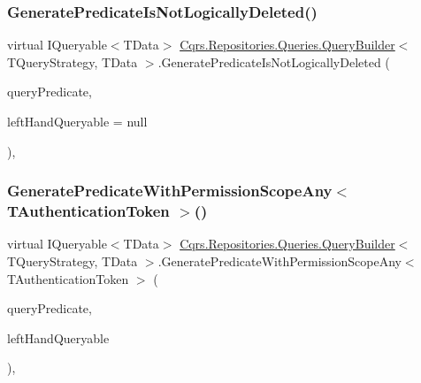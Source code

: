 \subsubsection{\texorpdfstring{Generate\+Predicate\+Is\+Not\+Logically\+Deleted()}{GeneratePredicateIsNotLogicallyDeleted()}}
{\footnotesize\ttfamily virtual I\+Queryable$<$T\+Data$>$ \hyperlink{classCqrs_1_1Repositories_1_1Queries_1_1QueryBuilder}{Cqrs.\+Repositories.\+Queries.\+Query\+Builder}$<$ T\+Query\+Strategy, T\+Data $>$.Generate\+Predicate\+Is\+Not\+Logically\+Deleted (\begin{DoxyParamCaption}\item[{\hyperlink{classCqrs_1_1Repositories_1_1Queries_1_1QueryPredicate}{Query\+Predicate}}]{query\+Predicate,  }\item[{I\+Queryable$<$ T\+Data $>$}]{left\+Hand\+Queryable = {\ttfamily null} }\end{DoxyParamCaption})\hspace{0.3cm}{\ttfamily [protected]}, {\ttfamily [virtual]}}

\mbox{\label{classCqrs_1_1Repositories_1_1Queries_1_1QueryBuilder_a7768a63fd46f991f87a00b51484c2f34_a7768a63fd46f991f87a00b51484c2f34}} 
\subsubsection{\texorpdfstring{Generate\+Predicate\+With\+Permission\+Scope\+Any$<$ T\+Authentication\+Token $>$()}{GeneratePredicateWithPermissionScopeAny< TAuthenticationToken >()}}
{\footnotesize\ttfamily virtual I\+Queryable$<$T\+Data$>$ \hyperlink{classCqrs_1_1Repositories_1_1Queries_1_1QueryBuilder}{Cqrs.\+Repositories.\+Queries.\+Query\+Builder}$<$ T\+Query\+Strategy, T\+Data $>$.Generate\+Predicate\+With\+Permission\+Scope\+Any$<$ T\+Authentication\+Token $>$ (\begin{DoxyParamCaption}\item[{\hyperlink{classCqrs_1_1Repositories_1_1Queries_1_1QueryPredicate}{Query\+Predicate}}]{query\+Predicate,  }\item[{I\+Queryable$<$ T\+Data $>$}]{left\+Hand\+Queryable }\end{DoxyParamCaption})\hspace{0.3cm}{\ttfamily [protected]}, {\ttfamily [virtual]}}

